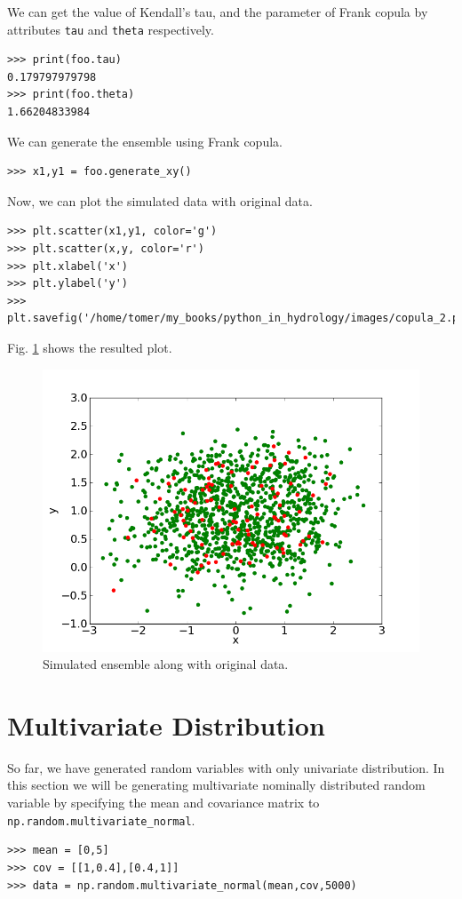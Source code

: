 \documentclass[10pt]{book}
\begin{document}
We can get the value of Kendall's tau, and the parameter of Frank copula by attributes \verb"tau" and \verb"theta" respectively. 
\beforeverb \begin{verbatim}
>>> print(foo.tau)
0.179797979798
>>> print(foo.theta)
1.66204833984
\end{verbatim} \afterverb

We can generate the ensemble using Frank copula. 
\beforeverb \begin{verbatim}
>>> x1,y1 = foo.generate_xy()
\end{verbatim} \afterverb

Now, we can plot the simulated data with original data.
\beforeverb \begin{verbatim}
>>> plt.scatter(x1,y1, color='g')
>>> plt.scatter(x,y, color='r')
>>> plt.xlabel('x')
>>> plt.ylabel('y')
>>> plt.savefig('/home/tomer/my_books/python_in_hydrology/images/copula_2.png')
\end{verbatim} \afterverb

Fig. \ref{fig:copula2} shows the resulted plot. 
\beforefig
\begin{figure}[h!]
  \centering
    \includegraphics[scale=0.5]{images/copula_2.png}
  \caption{Simulated ensemble along with original data.}
   \label{fig:copula2}
\end{figure}
\afterfig

\section{Multivariate Distribution}
So far, we have generated random variables with only univariate distribution. In this section we will be generating multivariate nominally distributed random variable by specifying the mean and covariance matrix to \verb"np.random.multivariate_normal". 
\beforeverb \begin{verbatim}
>>> mean = [0,5]
>>> cov = [[1,0.4],[0.4,1]]
>>> data = np.random.multivariate_normal(mean,cov,5000)
\end{verbatim} \afterverb
\end{document}
